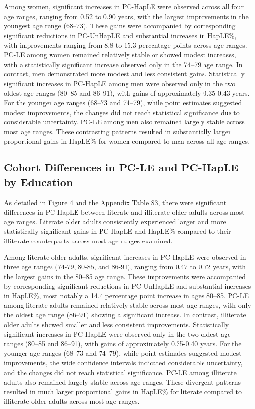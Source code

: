 \documentclass[12pt, a4paper]{article}
\begin{document}
Among women, significant increases in PC-HapLE were observed across all four age ranges, ranging from 0.52 to 0.90 years, with the largest improvements in the youngest age range (68–73). These gains were accompanied by corresponding significant reductions in PC-UnHapLE and substantial increases in HapLE\%, with improvements ranging from 8.8 to 15.3 percentage points across age ranges. PC-LE among women remained relatively stable or showed modest increases, with a statistically significant increase observed only in the 74–79 age range. In contrast, men demonstrated more modest and less consistent gains. Statistically significant increases in PC-HapLE among men were observed only in the two oldest age ranges (80–85 and 86–91), with gains of approximately 0.35-0.43 years. For the younger age ranges (68–73 and 74–79), while point estimates suggested modest improvements, the changes did not reach statistical significance due to considerable uncertainty. PC-LE among men also remained largely stable across most age ranges. These contrasting patterns resulted in substantially larger proportional gains in HapLE\% for women compared to men across all age ranges.

\subsection{Cohort Differences in PC-LE and PC-HapLE by Education}

As detailed in Figure 4 and the Appendix Table S3, there were significant differences in PC-HapLE between literate and illiterate older adults across most age ranges. Literate older adults consistently experienced larger and more statistically significant gains in PC-HapLE and HapLE\% compared to their illiterate counterparts across most age ranges examined.

Among literate older adults, significant increases in PC-HapLE were observed in three age ranges (74-79, 80-85, and 86-91), ranging from 0.47 to 0.72 years, with the largest gains in the 80–85 age range. These improvements were accompanied by corresponding significant reductions in PC-UnHapLE and substantial increases in HapLE\%, most notably a 14.4 percentage point increase in ages 80–85. PC-LE among literate adults remained relatively stable across most age ranges, with only the oldest age range (86–91) showing a significant increase. In contrast, illiterate older adults showed smaller and less consistent improvements. Statistically significant increases in PC-HapLE were observed only in the two oldest age ranges (80–85 and 86–91), with gains of approximately 0.35-0.40 years. For the younger age ranges (68–73 and 74–79), while point estimates suggested modest improvements, the wide confidence intervals indicated considerable uncertainty, and the changes did not reach statistical significance. PC-LE among illiterate adults also remained largely stable across age ranges. These divergent patterns resulted in much larger proportional gains in HapLE\% for literate compared to illiterate older adults across most age ranges.
\end{document}
